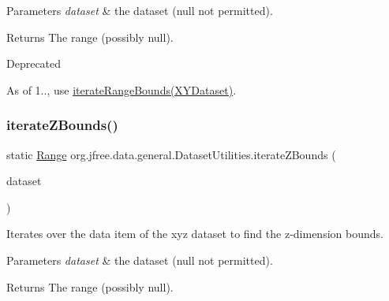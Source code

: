\begin{DoxyParams}{Parameters}
{\em dataset} & the dataset ({\ttfamily null} not permitted).\\
\hline
\end{DoxyParams}
\begin{DoxyReturn}{Returns}
The range (possibly {\ttfamily null}).
\end{DoxyReturn}
\begin{DoxyRefDesc}{Deprecated}
\item[\mbox{\hyperlink{deprecated__deprecated000261}{Deprecated}}]As of 1.., use \mbox{\hyperlink{classorg_1_1jfree_1_1data_1_1general_1_1_dataset_utilities_a27af79e63906c96f8420bb5dcdd8b479}{iterate\+Range\+Bounds(\+X\+Y\+Dataset)}}. \end{DoxyRefDesc}
\mbox{\label{classorg_1_1jfree_1_1data_1_1general_1_1_dataset_utilities_afc53b5eeb2011b0143aa6b8692de5b37}} 
\subsubsection{\texorpdfstring{iterate\+Z\+Bounds()}{iterateZBounds()}\hspace{0.1cm}{\footnotesize\ttfamily [1/2]}}
{\footnotesize\ttfamily static \mbox{\hyperlink{classorg_1_1jfree_1_1data_1_1_range}{Range}} org.\+jfree.\+data.\+general.\+Dataset\+Utilities.\+iterate\+Z\+Bounds (\begin{DoxyParamCaption}\item[{\mbox{\hyperlink{interfaceorg_1_1jfree_1_1data_1_1xy_1_1_x_y_z_dataset}{X\+Y\+Z\+Dataset}}}]{dataset }\end{DoxyParamCaption})\hspace{0.3cm}{\ttfamily [static]}}

Iterates over the data item of the xyz dataset to find the z-\/dimension bounds.


\begin{DoxyParams}{Parameters}
{\em dataset} & the dataset ({\ttfamily null} not permitted).\\
\hline
\end{DoxyParams}
\begin{DoxyReturn}{Returns}
The range (possibly {\ttfamily null}). 
\end{DoxyReturn}
\mbox{\label{classorg_1_1jfree_1_1data_1_1general_1_1_dataset_utilities_abc537e31840e9ad3bafe9e8143939f90}} 
